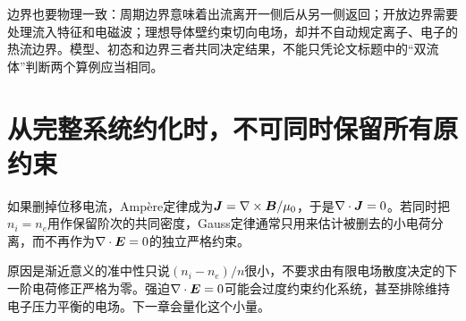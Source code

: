 边界也要物理一致：周期边界意味着出流离开一侧后从另一侧返回；开放边界需要处理流入特征和电磁波；理想导体壁约束切向电场，却并不自动规定离子、电子的热流边界。模型、初态和边界三者共同决定结果，不能只凭论文标题中的“双流体”判断两个算例应当相同。

\section{从完整系统约化时，不可同时保留所有原约束}
如果删掉位移电流，Ampère定律成为$\bm{J}=\nabla\times\bm{B}/\mu_0$，于是$\nabla\cdot\bm{J}=0$。若同时把$n_i=n_e$用作保留阶次的共同密度，Gauss定律通常只用来估计被删去的小电荷分离，而不再作为$\nabla\cdot\bm{E}=0$的独立严格约束。

原因是渐近意义的准中性只说$(n_i-n_e)/n$很小，不要求由有限电场散度决定的下一阶电荷修正严格为零。强迫$\nabla\cdot\bm{E}=0$可能会过度约束约化系统，甚至排除维持电子压力平衡的电场。下一章会量化这个小量。

